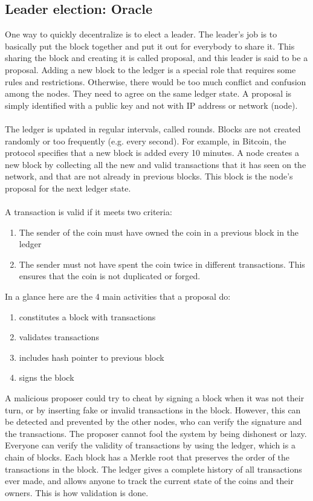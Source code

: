 \documentclass{report}
\begin{document}
\subsection{Leader election: Oracle}
One way to quickly decentralize is to elect a leader. The leader's job is to basically put the block together and put it out for everybody to share it. This sharing the block and creating it is called proposal, and this leader is said to be a proposal. Adding a new block to the ledger is a special role that requires some rules and restrictions. Otherwise, there would be too much conflict and confusion among the nodes. They need to agree on the same ledger state. A proposal is simply identified with a public key and not with IP address or network (node).\\\\
The ledger is updated in regular intervals, called rounds. Blocks are not created randomly or too frequently (e.g. every second). For example, in Bitcoin, the protocol specifies that a new block is added every 10 minutes. A node creates a new block by collecting all the new and valid transactions that it has seen on the network, and that are not already in previous blocks. This block is the node’s proposal for the next ledger state.\\\\
A transaction is valid if it meets two criteria:
\begin{enumerate}
	\item The sender of the coin must have owned the coin in a previous block in the ledger
	\item The sender must not have spent the coin twice in different transactions. This ensures that the coin is not duplicated or forged.
\end{enumerate}
In a glance here are the 4 main activities that a proposal do:
\begin{enumerate}
	\item constitutes a block with transactions
	\item validates transactions
	\item includes hash pointer to previous block
	\item signs the block
\end{enumerate}
A malicious proposer could try to cheat by signing a block when it was not their turn, or by inserting fake or invalid transactions in the block. However, this can be detected and prevented by the other nodes, who can verify the signature and the transactions. The proposer cannot fool the system by being dishonest or lazy. Everyone can verify the validity of transactions by using the ledger, which is a chain of blocks. Each block has a Merkle root that preserves the order of the transactions in the block. The ledger gives a complete history of all transactions ever made, and allows anyone to track the current state of the coins and their owners. This is how validation is done.\\\\
\end{document}
